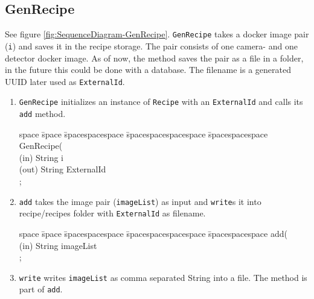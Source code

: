 \subsection{GenRecipe} \label{subseb:genrecipe}
See figure \ref{fig:SequenceDiagram-GenRecipe}.
\texttt{GenRecipe} takes a docker image pair (\texttt{i}) and saves it in the recipe storage. The pair consists of one camera- and one detector docker image. As of now, the method saves the pair as a file in a folder, in the future this could be done with a database. The filename is a generated UUID later used as \texttt{ExternalId}.
\begin{enumerate}
    \item \texttt{GenRecipe} initializes an instance of \texttt{Recipe} with an \texttt{ExternalId} and calls its \texttt{add} method.
    \begin{tabbing}
    space \= space \= spacespacespace \= spacespacespacespace \= spacespacespace \kill
    \>  GenRecipe(\\
    \>  \>  (in)	 \> 	String          \> i\\
    \>  \>  (out)	 \> 	String          \> ExternalId\\; 
    \end{tabbing}
    \item \texttt{add} takes the image pair (\texttt{imageList}) as input and \texttt{write}s it into recipe/recipes folder with \texttt{ExternalId} as filename.
    \begin{tabbing}
    space \= space \= spacespacespace \= spacespacespacespace \= spacespacespace \kill
    \>  add(\\
    \>  \>  (in)	 \> 	String          \> imageList\\;  
    \end{tabbing} \label{sign:add}
    \item \texttt{write} writes \texttt{imageList} as comma separated String into a file. The method is part of \texttt{add}. \label{sign:write}
\end{enumerate}

